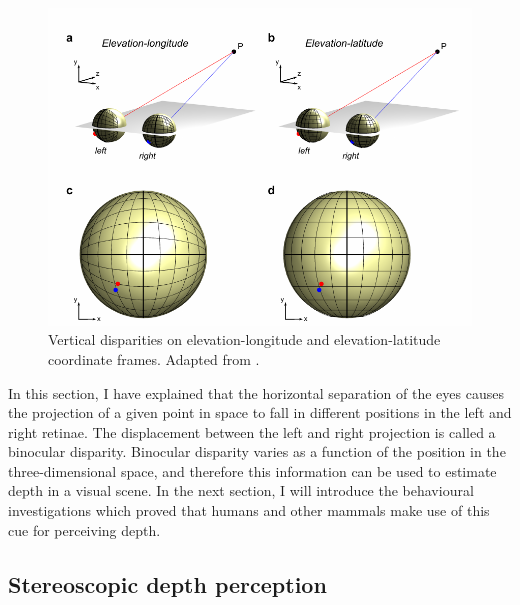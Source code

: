 \documentclass[oneside,12pt]{classes/CUEDthesisPSnPDF}
\begin{document}
\begin{figure}
  \centering
  \includegraphics{vertical-disparities}
  \caption{Vertical disparities on elevation-longitude and elevation-latitude coordinate frames. Adapted from \cite{Read2009}.}
  \label{fig:vertdisp}
\end{figure}

In this section, I have explained that the horizontal separation of the eyes causes the projection of a given point in space to fall in different positions in the left and right retinae. The displacement between the left and right projection is called a binocular disparity. Binocular disparity varies as a function of the position in the three-dimensional space, and therefore this information can be used to estimate depth in a visual scene. In the next section, I will introduce the behavioural investigations which proved that humans and other mammals make use of this cue for perceiving depth.


\subsection{Stereoscopic depth perception}
\end{document}
